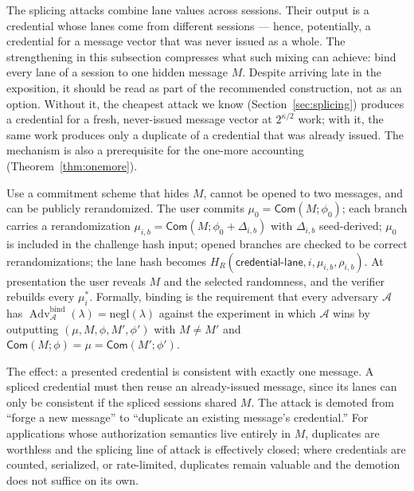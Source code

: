 \documentclass[11pt]{article}
\newcommand{\Adv}{\operatorname{Adv}}
\begin{document}
The splicing attacks combine lane values across sessions.  Their output is a
credential whose lanes come from different sessions --- hence, potentially, a
credential for a message vector that was never issued as a whole.  The
strengthening in this subsection compresses what such mixing can achieve:
bind every lane of a session to one hidden message $M$.  Despite arriving
late in the exposition, it should be read as part of the recommended
construction, not as an option.  Without it, the cheapest attack we know
(Section~\ref{sec:splicing}) produces a credential for a fresh, never-issued
message vector at $2^{\kappa/2}$ work; with it, the same work produces only a
duplicate of a credential that was already issued.  The mechanism is also a
prerequisite for the one-more accounting
(Theorem~\ref{thm:onemore}).

Use a commitment scheme that hides $M$,
cannot be opened to two messages, and can be publicly rerandomized.  The user
commits $\mu_0=\mathsf{Com}(M;\phi_0)$; each branch carries a rerandomization
$\mu_{i,b}=\mathsf{Com}(M;\phi_0+\Delta_{i,b})$ with $\Delta_{i,b}$
seed-derived; $\mu_0$ is included in the challenge hash input; opened branches
are checked to be correct rerandomizations; the lane hash becomes
$H_R(\mathsf{credential\mbox{-}lane},i,\mu_{i,b},\rho_{i,b})$.  At
presentation the user reveals $M$ and the selected randomness, and the
verifier rebuilds every $\mu_i^*$.  Formally, binding is the requirement
that every adversary $\mathcal A$ has
$\Adv^{\mathrm{bind}}_{\mathcal A}(\lambda)=\mathrm{negl}(\lambda)$ against
the experiment in which $\mathcal A$ wins by outputting
$(\mu,M,\phi,M',\phi')$ with $M\neq M'$ and
$\mathsf{Com}(M;\phi)=\mu=\mathsf{Com}(M';\phi')$.

The effect: a presented credential is consistent with exactly one message.
A spliced credential must then reuse an already-issued message, since its
lanes can only be consistent if the spliced sessions shared $M$.  The attack
is demoted from ``forge a new message'' to ``duplicate an existing message's
credential.''  For applications whose authorization semantics live entirely
in $M$, duplicates are worthless and the splicing line of attack is
effectively closed; where credentials are counted, serialized, or
rate-limited, duplicates remain valuable and the demotion does not suffice on
its own.
\end{document}
